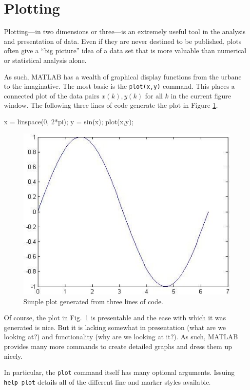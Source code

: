 \section{Plotting}
Plotting---in two dimensions or three---is an extremely useful tool in the analysis and presentation of data.  Even if they are never destined to be published, plots often give a ``big picture'' idea of a data set that is more valuable than numerical or statistical analysis alone.
\par
As such, MATLAB has a wealth of graphical display functions from the urbane to the imaginative.  The most basic is the \verb=plot(x,y)= command.  This places a connected plot of the data pairs $x(k),y(k)$ for all $k$ in the current figure window.  The following three lines of code generate the plot in Figure \ref{fig.matlab.plainplot}.

\begin{codex}
x = linspace(0, 2*pi);
y = sin(x);
plot(x,y);
\end{codex}

\begin{figure}[hbp!]
\centering
\includegraphics[width=.9\textwidth]{plainplot}
\caption{\footnotesize
        Simple plot generated from three lines of code.
        \label{fig.matlab.plainplot}
        }
\end{figure}

Of course, the plot in Fig.~\ref{fig.matlab.plainplot} is presentable and the ease with which it was generated is nice.  But it is lacking somewhat in presentation (what are we looking at?) and functionality (why are we looking at it?).  As such, MATLAB provides many more commands to create detailed graphs and dress them up nicely.
\par
In particular, the \verb=plot= command itself has many optional arguments.  Issuing \verb=help plot= details all of the different line and marker styles available.

